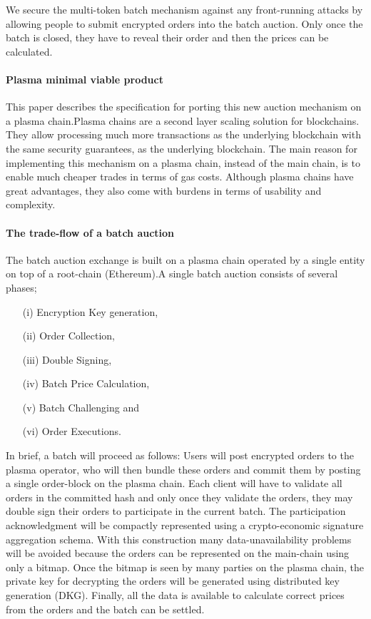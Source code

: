 \documentclass[11pt,parskip=full]{scrartcl}%
\begin{document}
We secure the multi-token batch mechanism against any front-running attacks by allowing people to submit encrypted orders into the batch auction. 
Only once the batch is closed, they have to reveal their order and then the prices can be calculated. 

\paragraph{Plasma minimal viable product}

This paper describes the specification for porting this new auction mechanism on a plasma chain.Plasma chains are a second layer scaling solution for blockchains. 
They allow processing much more transactions as the underlying blockchain with the same security guarantees, as the underlying blockchain. 
The main reason for implementing this mechanism on a plasma chain, instead of the main chain, is to enable much cheaper trades in terms of gas costs. 
Although plasma chains have great advantages, they also come with burdens in terms of usability and complexity. 

\paragraph{The trade-flow of a batch auction}  

The batch auction exchange is built on a plasma chain operated by a single entity on top of a root-chain (Ethereum).A single batch auction consists of several phases;
\begin{itemize}
\item[(i)] Encryption Key generation,
\item[(ii)] Order Collection,
\item[(iii)] Double Signing,
\item[(iv)] Batch Price Calculation,
\item[(v)] Batch Challenging and
\item[(vi)] Order Executions. 
\end{itemize}
In brief, a batch will proceed as follows: Users will post encrypted orders to the plasma operator, who will then bundle these orders and commit them by posting a single order-block on the plasma chain. 
Each client will have to validate all orders in the committed hash and only once they validate the orders, they may double sign their orders to participate in the current batch. 
The participation acknowledgment will be compactly represented using a crypto-economic signature aggregation schema. 
With this construction many data-unavailability problems will be avoided because the orders can be represented on the main-chain using only a bitmap. 
Once the bitmap is seen by many parties on the plasma chain, the private key for decrypting the orders will be generated using distributed key generation (DKG). 
Finally, all the data is available to calculate correct prices from the orders and the batch can be settled. 
\end{document}
